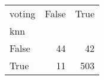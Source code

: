 \begin{tabular}{lrr}
\toprule
voting &  False &  True  \\
knn   &        &        \\
\midrule
False &     44 &     42 \\
True  &     11 &    503 \\
\bottomrule
\end{tabular}
